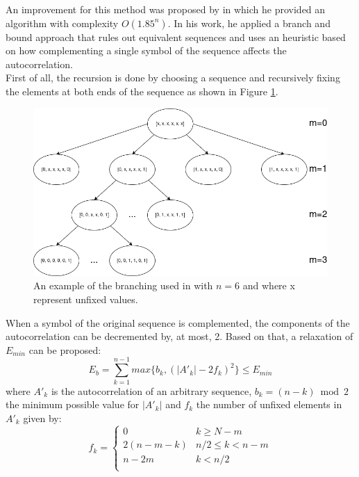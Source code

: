 An improvement for this method was   proposed by \citet{Mertens_1996} in which he provided an algorithm  with complexity  $O(1.85^n)$. In his work, he applied a branch and bound
approach that rules out equivalent sequences and uses an heuristic based on how complementing a single symbol of the sequence affects the autocorrelation.\\

  First of all, the recursion is done by choosing a sequence and recursively
  fixing the elements at both ends  of the sequence as shown in Figure
  \ref{prn_search:fig:1}.\\

  \begin{figure}[ht!]
    \includegraphics[scale=0.6]{Chapters/prn_search/branching_example.png}
    \caption{An example of the branching used in \citet{Mertens_1996} with
    $n = 6$ and where x represent unfixed values.}
    \label{prn_search:fig:1}
  \end{figure}

  When a symbol of the original sequence is complemented,
  the components of the autocorrelation can be decremented by, at most, 2. Based on
  that, a relaxation of $E_{min}$ can be proposed:\\
  \begin{equation}
    E_b = \sum_{k=1}^{n-1}max\{b_k, (|A'_k| - 2f_k)^2\} \leq E_{min}
  \end{equation}
  where $A'_k$ is the autocorrelation of an arbitrary sequence, $b_k = (n -
  k) \bmod 2$ the minimum possible value for $|A'_k|$ and $f_k$ the number of
  unfixed elements in $A'_k$ given by:
  \begin{equation}
    f_k = \left\{\begin{array}{ll}
        0 & k \geq N - m \\
        2(n - m - k) & n/2 \leq k < n - m\\
        n - 2m & k < n/2 \\
    \end{array}\right.
  \end{equation}

